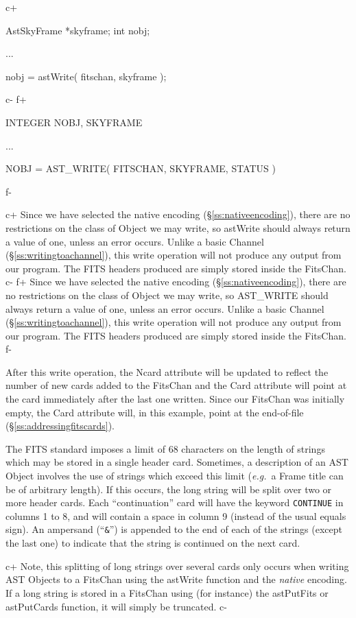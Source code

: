 \documentclass[twoside,11pt]{starlink}
\providecommand{\secref}[1]{\S\ref{#1}}
\begin{document}
{c+
\small
\begin{terminalv}
AstSkyFrame *skyframe;
int nobj;

...

nobj = astWrite( fitschan, skyframe );
\end{terminalv}
\normalsize
c-
f+
\small
\begin{terminalv}
      INTEGER NOBJ, SKYFRAME

      ...

      NOBJ = AST_WRITE( FITSCHAN, SKYFRAME, STATUS )
\end{terminalv}
\normalsize
f-

c+
Since we have selected the native encoding
(\secref{ss:nativeencoding}), there are no restrictions on the class
of Object we may write, so astWrite should always return a value of
one, unless an error occurs. Unlike a basic Channel
(\secref{ss:writingtoachannel}), this write operation will not produce
any output from our program. The FITS headers produced are simply
stored inside the FitsChan.
c-
f+
Since we have selected the native encoding
(\secref{ss:nativeencoding}), there are no restrictions on the class
of Object we may write, so AST\_WRITE should always return a value of
one, unless an error occurs. Unlike a basic Channel
(\secref{ss:writingtoachannel}), this write operation will not produce
any output from our program. The FITS headers produced are simply
stored inside the FitsChan.
f-

After this write operation, the Ncard attribute will be updated to
reflect the number of new cards added to the FitsChan and the Card
attribute will point at the card immediately after the last one
written. Since our FitsChan was initially empty, the Card attribute
will, in this example, point at the end-of-file
(\secref{ss:addressingfitscards}).

The FITS standard imposes a limit of 68 characters on the length of
strings which may be stored in a single header card. Sometimes, a
description of an AST Object involves the use of strings which exceed
this limit (\emph{e.g.}\ a Frame title can be of arbitrary length). If
this occurs, the long string will be split over two or more header cards.
Each ``continuation'' card will have the keyword \texttt{CONTINUE} in
columns 1 to 8, and will contain a space in column 9 (instead of the
usual equals sign). An ampersand (``\texttt{\&}'') is appended to the end of
each of the strings (except the last one) to indicate that the string is
continued on the next card.

c+
Note, this splitting of long strings over several cards only occurs when
writing AST Objects to a FitsChan using the astWrite function and the
\emph{native} encoding. If a long string is stored in a FitsChan using
(for instance) the astPutFits or astPutCards function, it will simply be truncated.
c-

}
\end{document}

